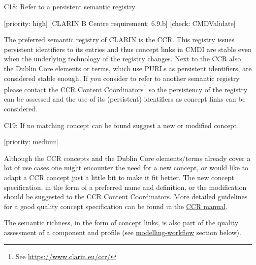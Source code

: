 C18: Refer to a persistent semantic registry

{[}priority: high{]} {[}CLARIN B Centre requirement: 6.9.b{]} {[}check:
CMDValidate{]}

The preferred semantic registry of CLARIN is the CCR. This registry
issues persistent identifiers to its entries and thus concept links in
CMDI are stable even when the underlying technology of the registry
changes. Next to the CCR also the Dublin Core elements or terms, which
use PURLs as persistent identifiers, are considered stable enough. If
you consider to refer to another semantic registry please contact the
CCR Content Coordinators\footnote{See \url{https://www.clarin.eu/ccr/}}
so the persistency of the registry can be assessed and the use of its
(persistent) identifiers as concept links can be considered.

C19: If no matching concept can be found suggest a new or modified
concept

{[}priority: medium{]}

Although the CCR concepts and the Dublin Core elements/terms already
cover a lot of use cases one might encounter the need for a new concept,
or would like to adapt a CCR concept just a little bit to make it fit
better. The new concept specification, in the form of a preferred name
and definition, or the modification should be suggested to the CCR
Content Coordinators. More detailed guidelines for a good quality
concept specification can be found in the
\href{https://www.overleaf.com/read/pxnsftbcphhb}{CCR manual}.

The semantic richness, in the form of concept links, is also part of the
quality assessment of a component and profile (see
\href{/modelling_component_metadata/workflow.md}{modelling-workflow} section
below).
